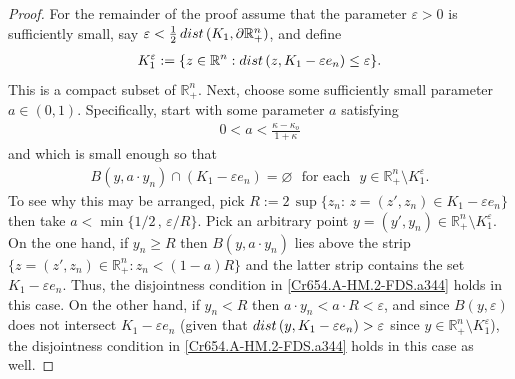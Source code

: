 \documentclass[10pt,a4paper]{amsart}
\begin{document}
\begin{proof}
For the remainder of the proof assume that the parameter $\varepsilon>0$ is sufficiently small, say 
$\varepsilon<\frac{1}{2}\,{\rm dist}\,(K_1,\partial{\mathbb{R}}^n_{+})$, and define 
%
\begin{align}\label{Cr654.A-HM.2-FDS.aTgab}
K_1^\varepsilon:=\{z\in{\mathbb{R}}^n:{\rm dist}\,(z,K_1-\varepsilon e_n)\leq\varepsilon\}.
\end{align}
%
This is a compact subset of ${\mathbb{R}}^n_{+}$. Next, choose some sufficiently small 
parameter $a\in(0,1)$. Specifically, start with some parameter $a$ satisfying 
%
\begin{align}\label{Cr654.A-HM.2-FDS.aaa}
0<a<\frac{\kappa-\kappa_o}{1+\kappa}
\end{align}
%
and which is small enough so that 
%
\begin{align}\label{Cr654.A-HM.2-FDS.a344}
B(y,a\cdot y_n)\cap(K_1-\varepsilon e_n)=\varnothing\,\,\text{ for each }\,\,
y\in{\mathbb{R}}^n_{+}\setminus K_1^\varepsilon.
\end{align}
%
To see why this may be arranged, pick $R:=2\,\sup\{z_n:\,z=(z',z_n)\in K_1-\varepsilon e_n\}$
then take $a<\min\big\{1/2\,,\,\varepsilon/R\big\}$. Pick an arbitrary point 
$y=(y',y_n)\in{\mathbb{R}}^n_{+}\setminus K_1^\varepsilon$. On the one hand, if $y_n\geq R$ then 
$B(y,a\cdot y_n)$ lies above the strip $\{z=(z',z_n)\in{\mathbb{R}}^n_{+}:z_n<(1-a)R\}$ 
and the latter strip contains the set $K_1-\varepsilon e_n$. Thus, the disjointness condition in 
\eqref{Cr654.A-HM.2-FDS.a344} holds in this case. On the other hand, if $y_n<R$ then 
$a\cdot y_n<a\cdot R<\varepsilon$, and since $B(y,\varepsilon)$ does not intersect 
$K_1-\varepsilon e_n$ (given that ${\rm dist}\,(y,K_1-\varepsilon e_n)>\varepsilon$
since $y\in{\mathbb{R}}^n_{+}\setminus K_1^\varepsilon$), the disjointness condition
in \eqref{Cr654.A-HM.2-FDS.a344} holds in this case as well. 


\end{proof}
\end{document}
